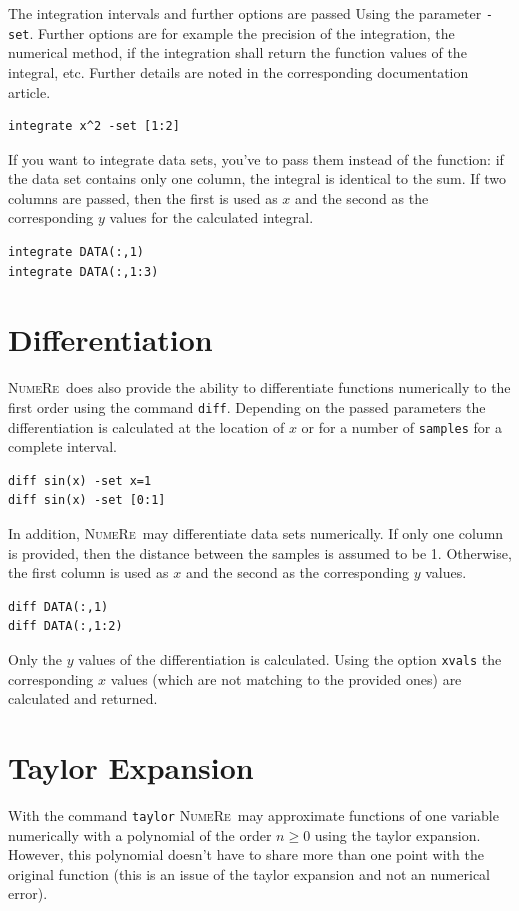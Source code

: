 \documentclass[DIV=14,headsepline,footsepline]{scrbook}
\newcommand{\NR}{\textsc{Nu\-me\-Re}}
\begin{document}
				The integration intervals and further options are passed Using the parameter \verb+-set+. Further options are for example the precision of the integration, the numerical method, if the integration shall return the function values of the integral, etc. Further details are noted in the corresponding documentation article.
				\begin{lstlisting}
integrate x^2 -set [1:2]
				\end{lstlisting}
				
				If you want to integrate data sets, you've to pass them instead of the function: if the data set contains only one column, the integral is identical to the sum. If two columns are passed, then the first is used as $x$ and the second as the corresponding $y$ values for the calculated integral.
				\begin{lstlisting}
integrate DATA(:,1)
integrate DATA(:,1:3)
				\end{lstlisting}
				
			\section{Differentiation}
				\NR\ does also provide the ability to differentiate functions numerically to the first order using the command \verb+diff+. Depending on the passed parameters the differentiation is calculated at the location of $x$ or for a number of \verb+samples+ for a complete interval.
				\begin{lstlisting}
diff sin(x) -set x=1
diff sin(x) -set [0:1]
				\end{lstlisting}
				
				In addition, \NR\ may differentiate data sets numerically. If only one column is provided, then the distance between the samples is assumed to be 1. Otherwise, the first column is used as $x$ and the second as the corresponding $y$ values.
				\begin{lstlisting}
diff DATA(:,1)
diff DATA(:,1:2)
				\end{lstlisting}
				Only the $y$ values of the differentiation is calculated. Using the option \verb+xvals+ the corresponding $x$ values (which are not matching to the provided ones) are calculated and returned.
				
			\section{Taylor Expansion}
				With the command \verb+taylor+ \NR\ may approximate functions of one variable numerically with a polynomial of the order $n\geq0$ using the taylor expansion. However, this polynomial doesn't have to share more than one point with the original function (this is an issue of the taylor expansion and not an numerical error).
	
\end{document}
